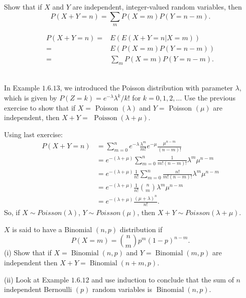\documentclass[en, normal, 11pt, black]{elegantnote}
\newenvironment{exercise}[1]{\begin{tcolorbox}[colback=black!15, colframe=black!80, breakable, title=#1]}{\end{tcolorbox}}
\renewenvironment{proof}{\begin{tcolorbox}[colback=white, colframe=black!50, breakable, title=Proof. ]\setlength{\parskip}{0.8em}}{\,\\\rightline{$\square$}\end{tcolorbox}}
\begin{document}
    \begin{exercise}{2.1.10}
        Show that if $X$ and $Y$ are independent, integer-valued random variables, then
        \[
            P(X+Y=n)=\sum_{m} P(X=m) P(Y=n-m). 
        \]
    \end{exercise}

    \begin{proof}
        \[
            \begin{aligned}
                P(X+Y=n)=&E\left(E(X+Y=n|X=m)\right)\\
                =&E(P(X=m)P(Y=n-m))\\
                =&\sum_mP(X=m)P(Y=n-m). 
            \end{aligned}
        \]
        \vspace*{-30pt}
    \end{proof}

    \begin{exercise}{2.1.11}
        In Example $1.6 .13$, we introduced the Poisson distribution with parameter $\lambda$, which is given by $P(Z=k)=e^{-\lambda} \lambda^{k} / k !$ for $k=0,1,2, \ldots$ Use the previous exercise to show that if $X=$ Poisson $(\lambda)$ and $Y=$ Poisson $(\mu)$ are independent, then $X+Y=$ $\operatorname{Poisson}(\lambda+\mu)$. 
    \end{exercise}

    \begin{proof}
        Using last exercise: 
        \[
            \begin{aligned}
                P(X+Y=n) &=\sum_{m=0}^{n} e^{-\lambda} \frac{\lambda^{m}}{m !} e^{-\mu} \frac{\mu^{n-m}}{(n-m) !} \\
                &=e^{-(\lambda+\mu)} \sum_{m=0}^{n} \frac{1}{m !(n-m) !} \lambda^{m} \mu^{n-m} \\
                &=e^{-(\lambda+\mu)} \frac{1}{n !} \sum_{m=0}^{n} \frac{n !}{m !(n-m) !} \lambda^{m} \mu^{n-m} \\
                &=e^{-(\lambda+\mu)} \frac{1}{n !} \binom{n}{m} \lambda^{m} \mu^{n-m} \\
                &=e^{-(\lambda+\mu)} \frac{(\mu+\lambda)^{n}}{n !}. 
            \end{aligned}
        \]
        So, if $X\sim Poisson(\lambda)$, $Y\sim Poisson(\mu)$, then $X+Y\sim Poisson(\lambda+\mu)$. 
    \end{proof}

    \begin{exercise}{2.1.12}
        $X$ is said to have a Binomial $(n, p)$ distribution if
        \[
            P(X=m)=\binom{n}{m}p^{m}(1-p)^{n-m}. 
        \]
    (i) Show that if $X=\operatorname{Binomial}(n, p)$ and $Y=\operatorname{Binomial}(m, p)$ are independent then $X+Y=\operatorname{Binomial}(n+m, p)$. 
    
    (ii) Look at Example $1.6 .12$ and use induction to conclude that the sum of $n$ independent Bernoulli $(p)$ random variables is $\operatorname{Binomial}(n, p)$. 
    \end{exercise}
\end{document}
